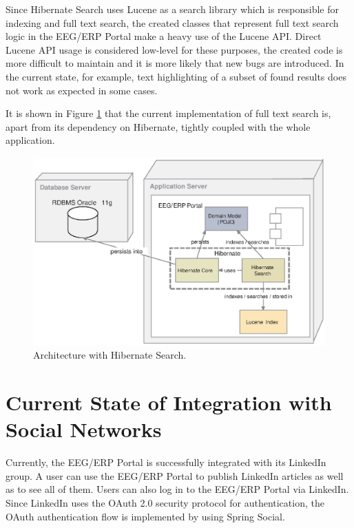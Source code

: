 Since Hibernate Search uses Lucene as a search library which is responsible for indexing and full text search, the created classes that represent full text search logic in the EEG/ERP Portal make a heavy use of the Lucene API.
Direct Lucene API usage is considered low-level for these purposes, the created code is more difficult to maintain and it is more likely that new bugs are introduced.
In the current state, for example, text highlighting of a subset of found results does not work as expected in some cases.

It is shown in Figure \ref{fig:architBeforeSolr} that the current implementation of full text search is, apart from its dependency on Hibernate, tightly coupled with the whole application. 


\begin{figure}[h]
	\centering
		\includegraphics[width=1.00\textwidth]{figures/architBeforeSolr.eps}
	\caption{Architecture with Hibernate Search.}
	\label{fig:architBeforeSolr}
\end{figure}






\section{Current State of Integration with Social Networks}

Currently, the EEG/ERP Portal is successfully integrated with its LinkedIn group. 
A user can use the EEG/ERP Portal to publish LinkedIn articles as well as to see all of them. 
Users can also log in to the EEG/ERP Portal via LinkedIn. 
Since LinkedIn uses the OAuth 2.0 security protocol for authentication, the OAuth authentication flow is implemented by using Spring Social.


